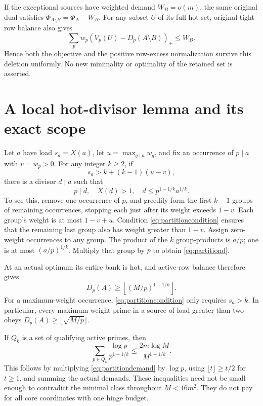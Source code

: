 \documentclass[11pt,a4paper]{article}
\theoremstyle{remark}\newtheorem{remark}[theorem]{Remark}
\newcommand{\pos}[1]{(#1)_+}
\begin{document}
If the exceptional sources have weighted demand \(W_B=o(m)\), the
same original dual satisfies \(\Phi_{A\setminus B}=\Phi_A-W_B\).
For any subset \(U\) of its full hot set, original tight-row balance
also gives
\[
 \sum_pw_p\pos{V_p(U)-D_p(A\setminus B)}\le W_B.
\]
Hence both the objective and the positive row-excess normalization
survive this deletion uniformly. No new minimality or optimality of
the retained set is asserted.

\section{A local hot-divisor lemma and its exact scope}

Let \(a\) have load \(s_a=X(a)\), let \(u=\max_{q\mid a}w_q\), and
fix an occurrence of \(p\mid a\) with \(v=w_p>0\).
For any integer \(k\ge2\), if
\begin{equation}
 s_a>k+(k-1)(u-v),\label{eq:partitioncondition}
\end{equation}
there is a divisor \(d\mid a\) such that
\begin{equation}
 p\mid d,\quad X(d)>1,\quad d\le p^{1-1/k}a^{1/k}.
 \label{eq:partitiond}
\end{equation}
To see this, remove one occurrence of \(p\), and greedily form the
first \(k-1\) groups of remaining occurrences, stopping each just
after its weight exceeds \(1-v\). Each group's weight is at most
\(1-v+u\). Condition \eqref{eq:partitioncondition} ensures that the
remaining last group also has weight greater than \(1-v\). Assign
zero-weight occurrences to any group. The product of the \(k\)
group-products is \(a/p\); one is at most \((a/p)^{1/k}\). Multiply
that group by \(p\) to obtain \eqref{eq:partitiond}.

At an actual optimum its entire bank is hot, and active-row balance
therefore gives
\begin{equation}
 D_p(A)\ge\left\lfloor(M/p)^{1-1/k}\right\rfloor.
 \label{eq:partitiondemand}
\end{equation}
For a maximum-weight occurrence, \eqref{eq:partitioncondition} only
requires \(s_a>k\). In particular, every maximum-weight prime in a
source of load greater than two obeys
\(D_p(A)\ge\lfloor\sqrt{M/p}\rfloor\).

If \(Q_k\) is a set of qualifying active primes, then
\[
 \sum_{p\in Q_k}\frac{\log p}{p^{1-1/k}}
 \le\frac{2m\log M}{M^{1-1/k}}.
\]
This follows by multiplying \eqref{eq:partitiondemand} by \(\log p\),
using \(\lfloor t\rfloor\ge t/2\) for \(t\ge1\), and summing the
actual demands. These inequalities need not be small enough to
contradict the minimal class throughout \(M<16m^2\). They do not
pay for all core coordinates with one hinge budget.
\end{document}
